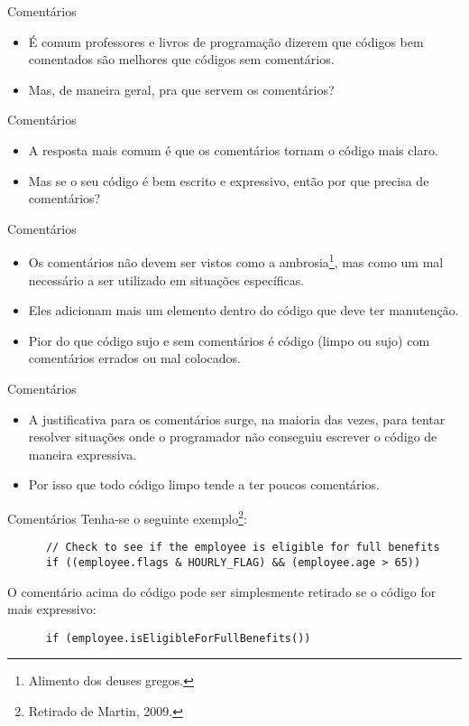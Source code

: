 \documentclass[11pt]{beamer}
\begin{document}
  \begin{frame}{Comentários}
    \begin{itemize}
      \item É comum professores e livros de programação dizerem que códigos bem comentados são melhores que códigos sem comentários.
      \item Mas, de maneira geral, pra que servem os comentários?
    \end{itemize}
  \end{frame}

  \begin{frame}{Comentários}
    \begin{itemize}
      \item A resposta mais comum é que os comentários tornam o código mais claro.
      \item Mas se o seu código é bem escrito e expressivo, então por que precisa de comentários?
    \end{itemize}
  \end{frame}


  \begin{frame}{Comentários}
    \begin{itemize}
      \item Os comentários não devem ser vistos como a ambrosia\footnote{Alimento dos deuses gregos.}, mas como um mal necessário a ser utilizado em situações específicas.
      \item Eles adicionam mais um elemento dentro do código que deve ter manutenção.
      \item Pior do que código sujo e sem comentários é código (limpo ou sujo) com comentários errados ou mal colocados. 
    \end{itemize}
  \end{frame}

  \begin{frame}{Comentários}
    \begin{itemize}
      \item A justificativa para os comentários surge, na maioria das vezes, para tentar resolver situações onde o programador não conseguiu escrever o código de maneira expressiva.
      \item Por isso que todo código limpo tende a ter poucos comentários. 
    \end{itemize}
  \end{frame}

  \begin{frame}[fragile]{Comentários}
    Tenha-se o seguinte exemplo\footnote{Retirado de Martin, 2009.}:
    \begin{lstlisting}
      // Check to see if the employee is eligible for full benefits
      if ((employee.flags & HOURLY_FLAG) && (employee.age > 65))
    \end{lstlisting}
    O comentário acima do código pode ser simplesmente retirado se o código for mais expressivo:
    \begin{lstlisting}
      if (employee.isEligibleForFullBenefits())
    \end{lstlisting}    
  \end{frame}
\end{document}
